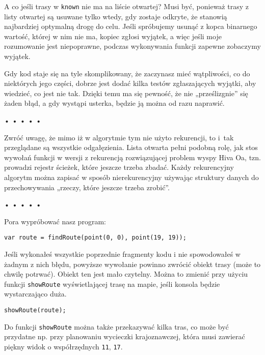   
A co jeśli trasy w \texttt{known} nie ma na liście otwartej? Musi być, ponieważ trasy z listy otwartej są usuwane tylko wtedy, gdy zostaje odkryte, że stanowią najbardziej optymalną drogę do celu. Jeśli spróbujemy usunąć z kopca binarnego wartość, której w nim nie ma, kopiec zgłosi wyjątek, a więc jeśli moje rozumowanie jest niepoprawne, podczas wykonywania funkcji zapewne zobaczymy wyjątek.

  
Gdy kod staje się na tyle skomplikowany, że zaczynasz mieć wątpliwości, co do niektórych jego części, dobrze jest dodać kilka testów zgłaszających wyjątki, aby wiedzieć, co jest nie tak. Dzięki temu ma się pewność, że nie „prześlizgnie” się żaden błąd, a gdy wystąpi usterka, będzie ją można od razu naprawić.



\begin{center}
• • • • •
\end{center}

  
Zwróć uwagę, że mimo iż w algorytmie tym nie użyto rekurencji, to i~tak przeglądane są wszystkie odgałęzienia. Lista otwarta pełni podobną rolę, jak stos wywołań funkcji w wersji z rekurencją rozwiązującej problem wyspy Hiva Oa, tzn. prowadzi rejestr ścieżek, które jeszcze trzeba zbadać. Każdy rekurencyjny algorytm można zapisać w sposób nierekurencyjny używając struktury danych do przechowywania „rzeczy, które jeszcze trzeba zrobić”.



\begin{center}
• • • • •
\end{center}

  
Pora wypróbować nasz program:

  
\begin{verbatim} 
var route = findRoute(point(0, 0), point(19, 19));
 \end{verbatim}
  
Jeśli wykonałeś wszystkie poprzednie fragmenty kodu i nie spowodowałeś w żadnym z nich błędu, powyższe wywołanie powinno zwrócić obiekt trasy (może to chwilę potrwać). Obiekt ten jest mało czytelny. Można to zmienić przy użyciu funkcji \texttt{showRoute} wyświetlającej trasę na mapie, jeśli konsola będzie wystarczająco duża.

  
\begin{verbatim} 
showRoute(route);
 \end{verbatim}
  
Do funkcji \texttt{showRoute} można także przekazywać kilka tras, co może być przydatne np. przy planowaniu wycieczki krajoznawczej, która musi zawierać piękny widok o współrzędnych \texttt{11}, \texttt{17}.

